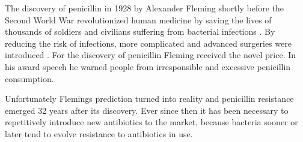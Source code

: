 The discovery of penicillin in 1928 by Alexander Fleming shortly before the Second World War revolutionized human medicine by saving the lives of thousands of soldiers and civilians suffering from bacterial infections \cite{cdc_biggest_2019}. By reducing the risk of infections, more complicated and advanced surgeries were introduced \cite{worldwar_resistance}. 
For the discovery of penicillin Fleming received the novel price. In his award speech he warned people from irresponsible and excessive penicillin consumption.

 
 
Unfortunately Flemings prediction turned into reality and penicillin resistance emerged 32 years after its discovery. Ever since then it has been necessary to repetitively introduce new antibiotics to the market, because bacteria sooner or later tend to evolve resistance to antibiotics in use. 

